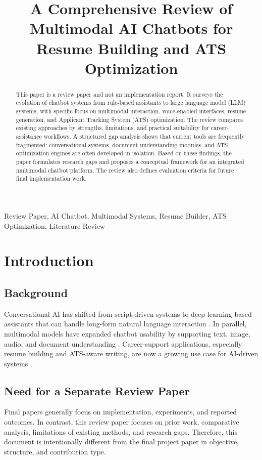 \documentclass[conference]{IEEEtran}
\title{A Comprehensive Review of Multimodal AI Chatbots for Resume Building and ATS Optimization}
\author{\IEEEauthorblockN{Amruta Anil Bargal}
\IEEEauthorblockA{\textit{Department of Data Science Engineering} \\
\textit{Dr. Vithalrao Vikhe Patil College Of Engineering}\\
Ahmednagar, India}}
\begin{document}
\maketitle

\begin{abstract}
This paper is a review paper and not an implementation report. It surveys the evolution of chatbot systems from rule-based assistants to large language model (LLM) systems, with specific focus on multimodal interaction, voice-enabled interfaces, resume generation, and Applicant Tracking System (ATS) optimization. The review compares existing approaches by strengths, limitations, and practical suitability for career-assistance workflows. A structured gap analysis shows that current tools are frequently fragmented: conversational systems, document understanding modules, and ATS optimization engines are often developed in isolation. Based on these findings, the paper formulates research gaps and proposes a conceptual framework for an integrated multimodal chatbot platform. The review also defines evaluation criteria for future final implementation work.
\end{abstract}

\begin{IEEEkeywords}
Review Paper, AI Chatbot, Multimodal Systems, Resume Builder, ATS Optimization, Literature Review
\end{IEEEkeywords}

\section{Introduction}
\subsection{Background}
Conversational AI has shifted from script-driven systems to deep learning based assistants that can handle long-form natural language interaction \cite{adamopoulou2020,weizenbaum1966,vaswani2017}. In parallel, multimodal models have expanded chatbot usability by supporting text, image, audio, and document understanding \cite{baltrusaitis2019,lu2019}. Career-support applications, especially resume building and ATS-aware writing, are now a growing use case for AI-driven systems \cite{black2020,resumai2024,resumebuilder2024}.

\subsection{Need for a Separate Review Paper}
Final papers generally focus on implementation, experiments, and reported outcomes. In contrast, this review paper focuses on prior work, comparative analysis, limitations of existing methods, and research gaps. Therefore, this document is intentionally different from the final project paper in objective, structure, and contribution type.
\end{document}
